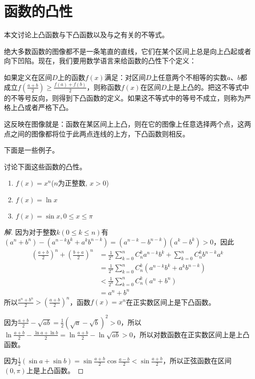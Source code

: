 
\section{函数的凸性}

本文讨论上凸函数与下凸函数以及与之有关的不等式。

绝大多数函数的图像都不是一条笔直的直线，它们在某个区间上总是向上凸起或者向下凹陷。现在，我们要用数学语言来给函数的凸性下个定义：
\begin{definition}
 如果定义在区间$D$上的函数$f(x)$满足：对区间$D$上任意两个不相等的实数$a$、$b$都成立$f(\frac{a+b}{2}) \geqslant \frac{f(a)+f(b)}{2}$，则称函数$f(x)$在区间$D$上是上凸的。把这不等式中的不等号反向，则得到下凸函数的定义。如果这不等式中的等号不成立，则称为严格上凸或者严格下凸。
\end{definition}
这反映在图像就是：函数在某区间上上凸，则在它的图像上任意选择两个点，这两点之间的图像都将位于此两点连线的上方，下凸函数则相反。

下面是一些例子。

\begin{example}
  讨论下面这些函数的凸性。
  \begin{enumerate}
  \item $f(x)=x^n$($n$为正整数, $x>0$)
  \item $f(x)=\ln{x}$
  \item $f(x)=\sin{x}, 0 \leqslant x \leqslant \pi$
  \end{enumerate}
\end{example}

\begin{proof}[解]
因为对于整数$k(0\leqslant k \leqslant n)$有$(a^n+b^n)-(a^{n-k}b^k+a^kb^{n-k})=(a^{n-k}-b^{n-k})(a^k-b^k)>0$，因此
\begin{equation}
  \begin{split}
\left( \frac{a+b}{2} \right)^n + \left( \frac{b+a}{2} \right)^n & = \frac{1}{2^n} \sum_{k=0}^nC_n^ka^{n-k}b^k + \sum_{k=0}^nC_n^kb^{n-k}a^k \\
& = \frac{1}{2^n} \sum_{k=0}^n C_n^k \left( a^{n-k}b^k+a^kb^{n-k} \right) \\
& < \frac{1}{2^n} \sum_{k=0}^n C_n^k \left( a^n+b^n \right) \\
& = a^n+b^n
\end{split}
\end{equation}
所以$\frac{a^n+b^n}{2}>\left( \frac{a+b}{2} \right)^n$，函数$f(x)=x^n$在正实数区间上是下凸函数。

因为$\frac{a+b}{2}-\sqrt{ab}=\frac{1}{2}(\sqrt{a}-\sqrt{b})^2>0$，所以 $\ln{\frac{a+b}{2}}-\frac{\ln{a}+\ln{b}}{2}=\ln{\frac{a+b}{2}}-\ln{\sqrt{ab}}>0$，所以对数函数在正实数区间上是上凸函数。

因为$\frac{1}{2}(\sin{a}+\sin{b})=\sin{\frac{a+b}{2}}\cos{\frac{a-b}{2}} < \sin{\frac{a+b}{2}}$，所以正弦函数在区间$(0,\pi)$上是上凸函数。
\end{proof}


